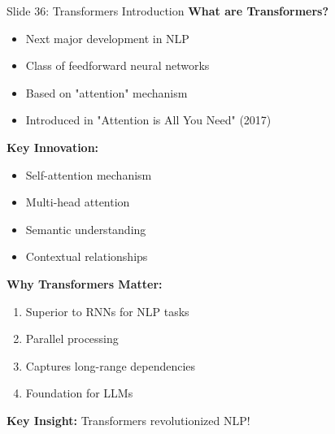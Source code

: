 \documentclass[8pt]{beamer}
\begin{document}
	\begin{frame}{Slide 36: Transformers Introduction}
		\fontsize{6.5}{7.5}\selectfont
		\textbf{What are Transformers?}
		\begin{itemize}
			\item Next major development in NLP
			\item Class of feedforward neural networks
			\item Based on "attention" mechanism
			\item Introduced in "Attention is All You Need" (2017)
		\end{itemize}
		
		\vspace{0.1cm}
		\textbf{Key Innovation:}
		\begin{itemize}
			\item Self-attention mechanism
			\item Multi-head attention
			\item Semantic understanding
			\item Contextual relationships
		\end{itemize}
		
		\vspace{0.1cm}
		\textbf{Why Transformers Matter:}
		\begin{enumerate}
			\item Superior to RNNs for NLP tasks
			\item Parallel processing
			\item Captures long-range dependencies
			\item Foundation for LLMs
		\end{enumerate}
		
		\textcolor{myblue}{\textbf{Key Insight:}} Transformers revolutionized NLP!
	\end{frame}
	
\end{document}
